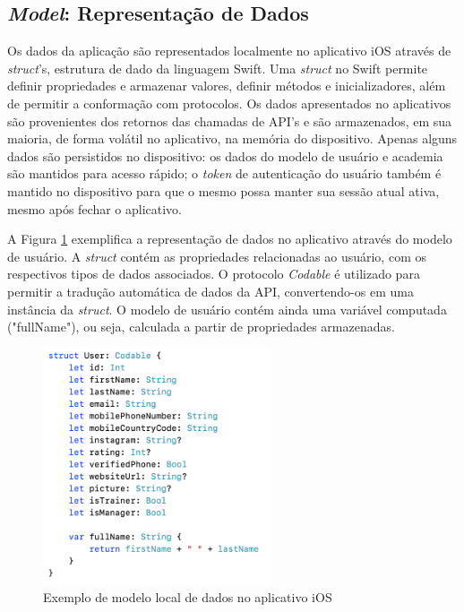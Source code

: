 \subsection{\textit{Model}: Representação de Dados}
Os dados da aplicação são representados localmente no aplicativo iOS através de \textit{struct}'s, estrutura de dado da linguagem Swift. Uma \textit{struct} no Swift permite definir propriedades e armazenar valores, definir métodos e inicializadores, além de permitir a conformação com protocolos. Os dados apresentados no aplicativos são provenientes dos retornos das chamadas de API's e são armazenados, em sua maioria, de forma volátil no aplicativo, na memória do dispositivo. Apenas alguns dados são persistidos no dispositivo: os dados do modelo de usuário e academia são mantidos para acesso rápido; o \textit{token} de autenticação do usuário também é mantido no dispositivo para que o mesmo possa manter sua sessão atual ativa, mesmo após fechar o aplicativo.


A Figura \ref{fig:user-model} exemplifica a representação de dados no aplicativo através do modelo de usuário. A \textit{struct} contém as propriedades relacionadas ao usuário, com os respectivos tipos de dados associados. O protocolo \textit{Codable} é utilizado para permitir a tradução automática de dados da API, convertendo-os em uma instância da \textit{struct}. O modelo de usuário contém ainda uma variável computada ("fullName"), ou seja, calculada a partir de propriedades armazenadas.

\begin{figure}[H]
    \centering
    \includegraphics[width=0.6\textwidth]{pfc/figuras/user-model.png}
    \caption{Exemplo de modelo local de dados no aplicativo iOS}
    \label{fig:user-model}
\end{figure}

